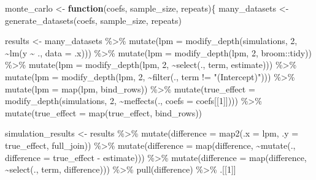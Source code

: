 \documentclass[
]{article}
\newenvironment{Shaded}{\begin{snugshade}}{\end{snugshade}}
\newcommand{\AttributeTok}[1]{\textcolor[rgb]{0.77,0.63,0.00}{#1}}
\newcommand{\ControlFlowTok}[1]{\textcolor[rgb]{0.13,0.29,0.53}{\textbf{#1}}}
\newcommand{\DecValTok}[1]{\textcolor[rgb]{0.00,0.00,0.81}{#1}}
\newcommand{\FunctionTok}[1]{\textcolor[rgb]{0.00,0.00,0.00}{#1}}
\newcommand{\NormalTok}[1]{#1}
\newcommand{\OtherTok}[1]{\textcolor[rgb]{0.56,0.35,0.01}{#1}}
\newcommand{\SpecialCharTok}[1]{\textcolor[rgb]{0.00,0.00,0.00}{#1}}
\newcommand{\StringTok}[1]{\textcolor[rgb]{0.31,0.60,0.02}{#1}}
\begin{document}
\begin{Shaded}
\begin{Highlighting}[]
\NormalTok{monte\_carlo }\OtherTok{\textless{}{-}} \ControlFlowTok{function}\NormalTok{(coefs, sample\_size, repeats)\{}
\NormalTok{  many\_datasets }\OtherTok{\textless{}{-}} \FunctionTok{generate\_datasets}\NormalTok{(coefs, sample\_size, repeats)}
  
\NormalTok{  results }\OtherTok{\textless{}{-}}\NormalTok{ many\_datasets }\SpecialCharTok{\%\textgreater{}\%} 
    \FunctionTok{mutate}\NormalTok{(}\AttributeTok{lpm =} \FunctionTok{modify\_depth}\NormalTok{(simulations, }\DecValTok{2}\NormalTok{, }\SpecialCharTok{\textasciitilde{}}\FunctionTok{lm}\NormalTok{(y }\SpecialCharTok{\textasciitilde{}}\NormalTok{ ., }\AttributeTok{data =}\NormalTok{ .x))) }\SpecialCharTok{\%\textgreater{}\%} 
    \FunctionTok{mutate}\NormalTok{(}\AttributeTok{lpm =} \FunctionTok{modify\_depth}\NormalTok{(lpm, }\DecValTok{2}\NormalTok{, broom}\SpecialCharTok{::}\NormalTok{tidy)) }\SpecialCharTok{\%\textgreater{}\%} 
    \FunctionTok{mutate}\NormalTok{(}\AttributeTok{lpm =} \FunctionTok{modify\_depth}\NormalTok{(lpm, }\DecValTok{2}\NormalTok{, }\SpecialCharTok{\textasciitilde{}}\FunctionTok{select}\NormalTok{(., term, estimate))) }\SpecialCharTok{\%\textgreater{}\%} 
    \FunctionTok{mutate}\NormalTok{(}\AttributeTok{lpm =} \FunctionTok{modify\_depth}\NormalTok{(lpm, }\DecValTok{2}\NormalTok{, }\SpecialCharTok{\textasciitilde{}}\FunctionTok{filter}\NormalTok{(., term }\SpecialCharTok{!=} \StringTok{"(Intercept)"}\NormalTok{))) }\SpecialCharTok{\%\textgreater{}\%} 
    \FunctionTok{mutate}\NormalTok{(}\AttributeTok{lpm =} \FunctionTok{map}\NormalTok{(lpm, bind\_rows)) }\SpecialCharTok{\%\textgreater{}\%} 
    \FunctionTok{mutate}\NormalTok{(}\AttributeTok{true\_effect =} \FunctionTok{modify\_depth}\NormalTok{(simulations, }\DecValTok{2}\NormalTok{, }\SpecialCharTok{\textasciitilde{}}\FunctionTok{meffects}\NormalTok{(., }\AttributeTok{coefs =}\NormalTok{ coefs[[}\DecValTok{1}\NormalTok{]]))) }\SpecialCharTok{\%\textgreater{}\%} 
    \FunctionTok{mutate}\NormalTok{(}\AttributeTok{true\_effect =} \FunctionTok{map}\NormalTok{(true\_effect, bind\_rows))}

\NormalTok{  simulation\_results }\OtherTok{\textless{}{-}}\NormalTok{ results }\SpecialCharTok{\%\textgreater{}\%} 
    \FunctionTok{mutate}\NormalTok{(}\AttributeTok{difference =} \FunctionTok{map2}\NormalTok{(}\AttributeTok{.x =}\NormalTok{ lpm, }\AttributeTok{.y =}\NormalTok{ true\_effect, full\_join)) }\SpecialCharTok{\%\textgreater{}\%} 
    \FunctionTok{mutate}\NormalTok{(}\AttributeTok{difference =} \FunctionTok{map}\NormalTok{(difference, }\SpecialCharTok{\textasciitilde{}}\FunctionTok{mutate}\NormalTok{(., }\AttributeTok{difference =}\NormalTok{ true\_effect }\SpecialCharTok{{-}}\NormalTok{ estimate))) }\SpecialCharTok{\%\textgreater{}\%} 
    \FunctionTok{mutate}\NormalTok{(}\AttributeTok{difference =} \FunctionTok{map}\NormalTok{(difference, }\SpecialCharTok{\textasciitilde{}}\FunctionTok{select}\NormalTok{(., term, difference))) }\SpecialCharTok{\%\textgreater{}\%} 
    \FunctionTok{pull}\NormalTok{(difference) }\SpecialCharTok{\%\textgreater{}\%} 
\NormalTok{    .[[}\DecValTok{1}\NormalTok{]]}


\end{Highlighting}
\end{Shaded}
\end{document}
